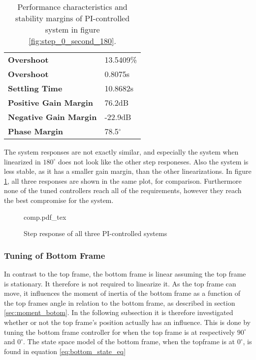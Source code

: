 \documentclass[../../../Main]{subfiles}
\begin{document}
\begin{table}[h]
	 \centering
	 \begin{tabular}{ll}
		 \textbf{Overshoot} & 13.5409\%\\
		 \textbf{Overshoot} & 0.8075s\\
		 \textbf{Settling Time} & 10.8682s\\
		 \textbf{Positive Gain Margin} & 76.2dB\\
		 \textbf{Negative Gain Margin} & -22.9dB\\
		 \textbf{Phase Margin} & 78.5$^\circ$
	 \end{tabular}
	 \caption{Performance characteristics and stability margins of PI-controlled system in figure \ref{fig:step_0_second_180}.}
	 \label{tab:performance_0_4}
\end{table}

The system responses are not exactly similar, and especially the system when linearized in $180^\circ$ does not look like the other step responeses. Also the system is less stable, as it has a smaller gain margin, than the other linearizations. In figure \ref{fig:comp}, all three responses are shown in the same plot, for comparison. Furthermore none of the tuned controllers reach all of the requirements, however they reach the best compromise for the system.

\begin{figure}[H]
\centering
\def\svgwidth{\textwidth}
{comp.pdf_tex}
\caption{Step response of all three PI-controlled systems}
\label{fig:comp}
\end{figure}

\subsubsection{Tuning of Bottom Frame}

In contrast to the top frame, the bottom frame is linear assuming the top frame is stationary. It therefore is not required to linearize it. 
As the top frame can move, it influences the moment of inertia of the bottom frame as a function of the top frames angle in relation to the bottom frame, as described in section \ref{sec:moment_botom}.
In the following subsection it is therefore investigated whether or not the top frame's position actually has an influence.
This is done by tuning the bottom frame controller for when the top frame is at respectively $90^\circ$ and $0^\circ$.
The state space model of the bottom frame, when the topframe is at $0^\circ$, is found in equation \eqref{eq:bottom_state_eq}
\end{document}
